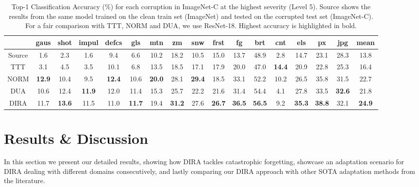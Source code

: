 \begin{table*}[]
    \centering
    \begin{tabular}{c|c c c c c c c c c c c c c c c|c}
                 & gaus & shot & impul & defcs & gls & mtn & zm & snw & frst & fg & brt & cnt & els & px &jpg & mean \\\hline
Source  & 1.6 & 2.3 & 1.6 & 9.4 & 6.6 & 10.2 & 18.2 & 10.5 & 15.0 & 13.7 & 48.9 & 2.8 & 14.7 & 23.1 & 28.3 & 13.8\\
TTT  & 3.1 & 4.5 & 3.5 & 10.1 & 6.8 & 13.5 & 18.5 & 17.1 & 17.9 & 20.0 & 47.0 & \textbf{14.4} & 20.9 & 22.8 & 25.3 & 16.4\\
NORM  & \textbf{12.9} & 10.4 & 9.5 & \textbf{12.4} & 10.6 & \textbf{20.0} & 28.1 & \textbf{29.4} & 18.5 & 33.1 & 52.2 & 10.2 & 26.5 & 35.8 & 31.5 & 22.7\\
DUA  & 10.6 & 12.4 & \textbf{11.9} & 12.0 & 11.4 & 15.3 & 25.7 & 22.2 & 21.6 & 31.4 & 54.4 & 4.1 & 27.8 & 33.5 & \textbf{32.6} & 21.8\\
DIRA  & 11.7 & \textbf{13.6} & 11.5 & 11.0 & \textbf{11.7} & 19.4 & \textbf{31.2} & 27.6 & \textbf{26.7} & \textbf{36.5} & \textbf{56.5} & 9.2 & \textbf{35.3} & \textbf{38.8} & 32.1 & \textbf{24.9}\\ 
    \end{tabular}
    \caption{Top-1 Classification Accuracy (\%) for each corruption in ImageNet-C at the highest severity (Level 5). Source shows the results from the same model trained on the clean train set (ImageNet) and tested on the corrupted test set (ImageNet-C). For a fair comparison with TTT, NORM and DUA, we use ResNet-18. Highest accuracy is highlighted in bold.}
    \label{tab:SOTA_ImageNet_results}
\end{table*}


\section{Results \& Discussion}
\label{sec:results}
In this section we present our detailed results, showing how DIRA tackles catastrophic forgetting, showcase an adaptation scenario for DIRA dealing with different domains consecutively, and lastly comparing our DIRA approach with other SOTA adaptation methods from the literature.

